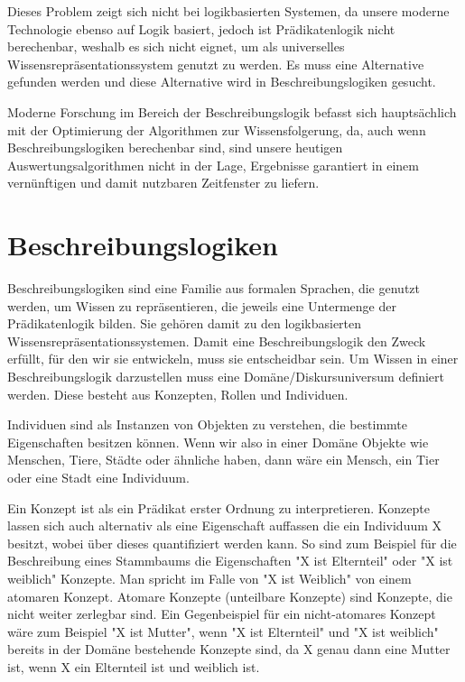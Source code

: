 \documentclass[runningheads,a4paper]{llncs}
\begin{document}
 Dieses Problem zeigt sich nicht bei logikbasierten Systemen, da unsere moderne Technologie ebenso auf Logik basiert, jedoch ist Prädikatenlogik nicht berechenbar, weshalb es sich nicht eignet, um als universelles Wissensrepräsentationssystem genutzt zu werden. Es muss eine Alternative gefunden werden und diese Alternative wird in Beschreibungslogiken gesucht.

 Moderne Forschung im Bereich der Beschreibungslogik befasst sich hauptsächlich mit der Optimierung der Algorithmen zur Wissensfolgerung, da, auch wenn Beschreibungslogiken berechenbar sind, sind unsere heutigen Auswertungsalgorithmen nicht in der Lage, Ergebnisse garantiert in einem vernünftigen und damit nutzbaren Zeitfenster zu liefern.



\section{Beschreibungslogiken}

Beschreibungslogiken sind eine Familie aus formalen Sprachen, die genutzt werden, um Wissen zu repräsentieren, die jeweils eine Untermenge der Prädikatenlogik bilden. Sie gehören damit zu den logikbasierten Wissensrepräsentationssystemen. Damit eine Beschreibungslogik den Zweck erfüllt, für den wir sie entwickeln, muss sie entscheidbar sein. Um Wissen in einer  Beschreibungslogik darzustellen muss eine Domäne/Diskursuniversum definiert werden. Diese besteht aus Konzepten, Rollen und Individuen.

Individuen sind als Instanzen von Objekten zu verstehen, die bestimmte Eigenschaften besitzen können. Wenn wir also in einer Domäne Objekte wie Menschen, Tiere, Städte oder ähnliche haben, dann wäre ein Mensch, ein Tier oder eine Stadt eine Individuum.

Ein Konzept ist als ein Prädikat erster Ordnung zu interpretieren. Konzepte lassen sich auch alternativ als eine Eigenschaft auffassen die ein Individuum X besitzt, wobei über dieses quantifiziert werden kann. So sind zum Beispiel für die Beschreibung eines Stammbaums die Eigenschaften "X ist Elternteil" oder "X ist weiblich" Konzepte. Man spricht im Falle von "X ist Weiblich" von einem atomaren Konzept. Atomare Konzepte (unteilbare Konzepte) sind Konzepte, die nicht weiter zerlegbar sind. Ein Gegenbeispiel für ein nicht-atomares Konzept wäre zum Beispiel "X ist Mutter", wenn "X ist Elternteil" und  "X ist weiblich" bereits in der Domäne bestehende Konzepte sind, da X genau dann eine Mutter ist, wenn X ein Elternteil ist und weiblich ist.
\end{document}
